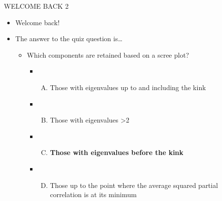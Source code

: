 \documentclass[
  ignorenonframetext,
]{beamer}
\providecommand{\tightlist}{%
  \setlength{\itemsep}{0pt}\setlength{\parskip}{0pt}}
\begin{document}
\begin{frame}{WELCOME BACK 2}
\protect\hypertarget{welcome-back-2}{}

\begin{itemize}
\tightlist
\item
  Welcome back!
\item
  The answer to the quiz question is\ldots{}

  \begin{itemize}
  \tightlist
  \item
    Which components are retained based on a scree plot?

    \begin{itemize}
    \item
      \begin{enumerate}
      [A)]
      \tightlist
      \item
        Those with eigenvalues up to and including the kink
      \end{enumerate}
    \item
      \begin{enumerate}
      [A)]
      \setcounter{enumi}{1}
      \tightlist
      \item
        Those with eigenvalues \textgreater2
      \end{enumerate}
    \item
      \begin{enumerate}
      [A)]
      \setcounter{enumi}{2}
      \tightlist
      \item
        \textbf{Those with eigenvalues before the kink}
      \end{enumerate}
    \item
      \begin{enumerate}
      [A)]
      \setcounter{enumi}{3}
      \tightlist
      \item
        Those up to the point where the average squared partial
        correlation is at its minimum
      \end{enumerate}
    \end{itemize}
  \end{itemize}
\end{itemize}

\end{frame}
\end{document}
